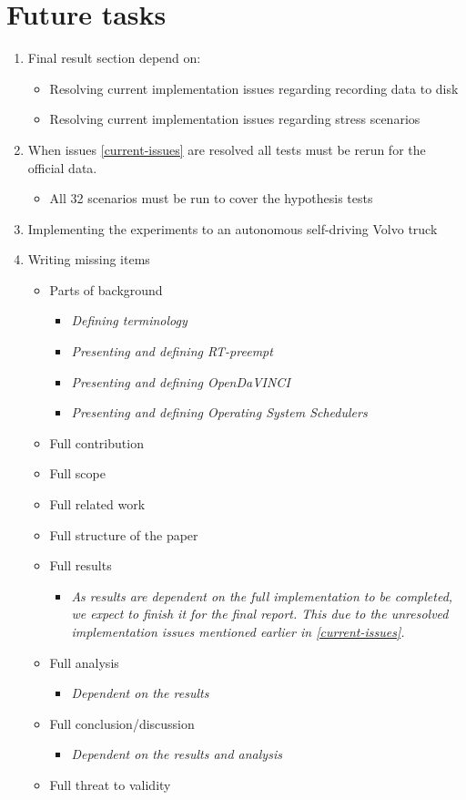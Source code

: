 \section{Future tasks}
\begin{enumerate}[label=\protect\circled{\arabic*}]
\itemsep0.5em
\item Final result section depend on:
	\begin{itemize}
		\label{current-issues}
		\item Resolving current implementation issues regarding recording data to disk
		\item Resolving current implementation issues regarding stress scenarios
	\end{itemize}
\item When issues \ref{current-issues} are resolved all tests must be rerun for the official data.
	\begin{itemize}
		\item All 32 scenarios must be run to cover the hypothesis tests
	\end{itemize}
\item Implementing the experiments to an autonomous self-driving Volvo truck
\item Writing missing items
	\begin{itemize}
		\item Parts of background 
		\begin{itemize}
			\item \textit{Defining terminology}
			\item \textit{Presenting and defining RT-preempt}
			\item \textit{Presenting and defining OpenDaVINCI}
			\item \textit{Presenting and defining Operating System Schedulers}
		\end{itemize}
		\item Full contribution
		\item Full scope
		\item Full related work
		\item Full structure of the paper
		\item Full results
			\begin{itemize}
				\item \textit{As results are dependent on the full implementation to be completed, we expect to finish it for the final report. This due to the unresolved implementation issues mentioned earlier in \ref{current-issues}.}
			\end{itemize}
		\item Full analysis
			\begin{itemize}
				\item \textit{Dependent on the results}
			\end{itemize}
		\item Full conclusion/discussion
			\begin{itemize}
				\item \textit{Dependent on the results and analysis}
			\end{itemize}
		\item Full threat to validity
	\end{itemize}
\end{enumerate}

